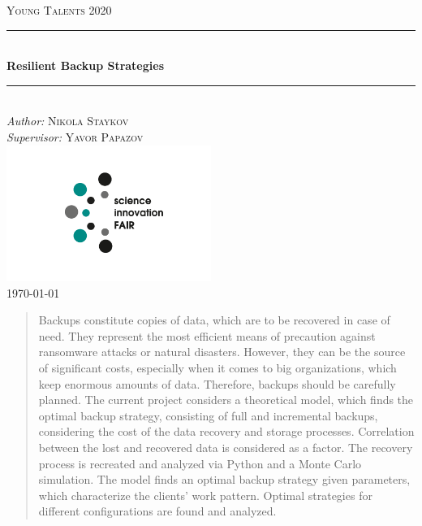 \documentclass[11pt, a4paper]{article}
\theoremstyle{definition}
\begin{document}
\begin{titlepage}
	\newcommand{\HRule}{\rule{\linewidth}{0.5mm}}
	\centering
	\textsc{\LARGE Young Talents 2020}\\[1cm]
	\HRule\\[1 cm]
	{\huge\bfseries Resilient Backup Strategies}\\[0.5 cm] 
	\HRule\\
			\vfill
			\Large
			\textit{Author:}
			\textsc{Nikola Staykov}\\
            \vspace{2cm}
			\Large
			\textit{Supervisor:}
            \textsc{Yavor Papazov}\\
            \includegraphics[width=0.5\textwidth]{Innofair_logo.png}\\
    \vfill	
	{\large\today}   
	\vfill
\end{titlepage}

\tableofcontents
\newpage
\begin{abstract}
		Backups constitute copies of data, which are to be recovered in case of need. They represent the most efficient means of precaution against ransomware attacks or natural disasters. However, they can be the source of significant costs, especially when it comes to big organizations, which keep enormous amounts of data. Therefore, backups should be carefully planned. The current project considers a theoretical model, which finds the optimal   backup strategy, consisting of full and incremental backups, considering the cost of the data recovery and storage processes. Correlation between the lost and recovered data is considered as a factor. The recovery process is recreated and analyzed via Python and a Monte Carlo simulation. The model finds an optimal backup strategy given parameters, which characterize the clients' work pattern. Optimal strategies for different configurations are found and analyzed.
\end{abstract}
\end{document}

